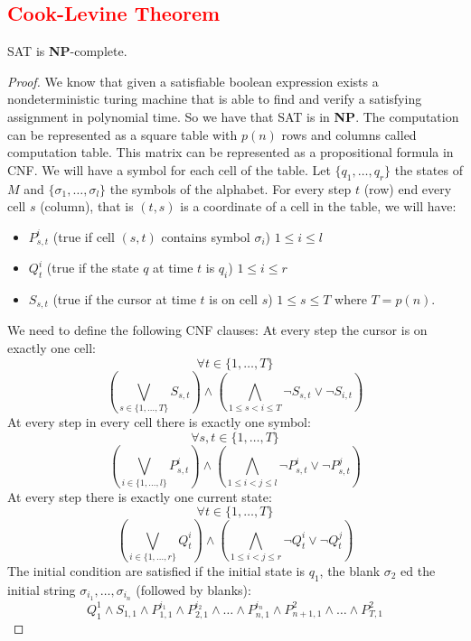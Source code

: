 \documentclass[12pt]{article}
\begin{document}
\subsection{\textcolor{red}{Cook-Levine Theorem}}
\begin{defbox}[\textcolor{red}{Cook-Levine Theorem}]
  \textsc{SAT} is \textbf{NP}-complete.
\end{defbox}
\begin{proof}
  We know that given a satisfiable boolean expression exists a nondeterministic turing machine that is able to find and verify a satisfying assignment in polynomial time. So we have that \textsc{SAT} is in \textbf{NP}. The computation can be represented as a square table with $p(n)$ rows and columns called computation table.  This matrix can be represented as a propositional formula in CNF. We will have a symbol for each cell of the table. Let $\{q_1,\dots,q_r\}$ the states of $M$ and $\{\sigma_1,\dots,\sigma_l\}$ the symbols of the alphabet. For every step $t$ (row) end every cell $s$ (column), that is $(t,s)$ is a coordinate of a cell in the table, we will have:
  \begin{itemize}
    \item $P^i_{s,t}$ (true if cell $(s,t)$ contains symbol $\sigma_i$) $1\le i\le l$
    \item $Q^i_{t}$ (true if the state $q$ at time $t$ is $q_i$) $1\le i\le r$
    \item $S_{s,t}$ (true if the cursor at time $t$ is on cell $s$) $1\le s\le T$ where $T=p(n)$.
  \end{itemize}
  We need to define the following CNF clauses:
  At every step the cursor is on exactly one cell:
  $$\forall t\in\{1,\dots,T\}$$
  \[
\left( \bigvee_{s \in \{1, \dots, T\}} S_{s,t} \right) \land \left( \bigwedge_{1 \leq s < i \leq T} \neg S_{s,t} \lor \neg S_{i,t} \right)
\]
At every step in every cell there is exactly one symbol:
$$\forall s,t\in\{1,\dots,T\}$$
\[
\left( \bigvee_{i \in \{1, \dots, l\}} P^i_{s,t} \right) \land \left( \bigwedge_{1 \leq i < j \leq l} \neg P^i_{s,t} \lor \neg P^j_{s,t} \right)
\]
At every step there is exactly one current state:
$$\forall t\in\{1,\dots,T\}$$
\[
\left( \bigvee_{i \in \{1, \dots, r\}} Q^i_{t} \right) \land \left( \bigwedge_{1 \leq i < j \leq r} \neg Q^i_{t} \lor \neg Q^j_{t} \right)
\]
The initial condition are satisfied if the initial state is $q_1$, the blank $\sigma_2$ ed the initial string $\sigma_{i_1},\dots,\sigma_{i_n}$ (followed by blanks):
$$Q^1_1\land S_{1,1}\land P^{i_1}_{1,1}\land P^{i_2}_{2,1}\land\dots\land P^{i_n}_{n,1}\land P^2_{n+1,1}\land\dots\land P^2_{T,1}$$

\end{proof}
\end{document}
